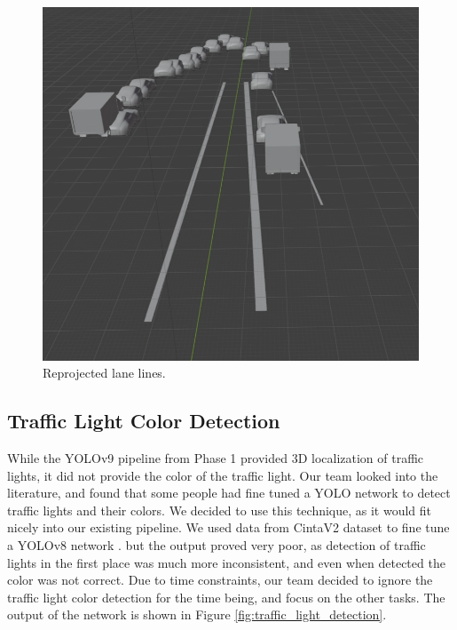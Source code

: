 \begin{figure}
    \centering
    \includegraphics[width=0.95\linewidth]{images/reprojected_lanes.png}
    \caption{Reprojected lane lines.}
    \label{fig:reprojected_lane_lines}
\end{figure}

\subsection{Traffic Light Color Detection}
While the YOLOv9 pipeline from Phase 1 provided 3D localization of traffic lights, it did not provide the color of the traffic light. Our team looked into the literature, and found that some people had fine tuned a YOLO network to detect traffic lights and their colors. We decided to use this technique, as it would fit nicely into our existing pipeline. We used data from CintaV2 dataset to fine tune a YOLOv8 network \cite{cinta_v2_dataset}. but the output proved very poor, as detection of traffic lights in the first place was much more inconsistent, and even when detected the color was not correct. Due to time constraints, our team decided to ignore the traffic light color detection for the time being, and focus on the other tasks. The output of the network is shown in Figure \ref{fig:traffic_light_detection}.


